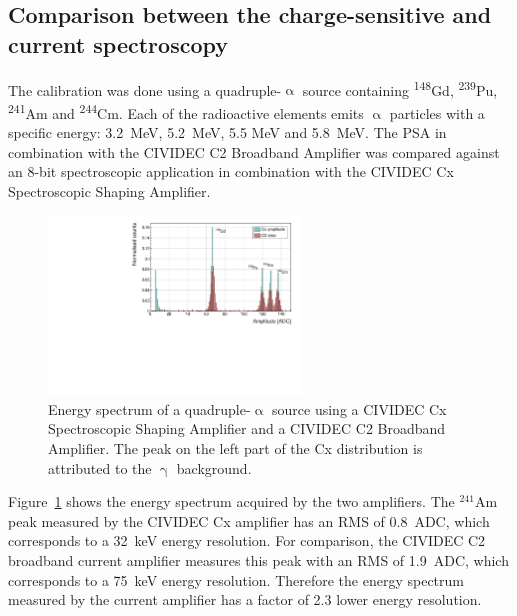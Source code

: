 \subsection{Comparison between the charge-sensitive and current spectroscopy}
The calibration was done using a quadruple-$\upalpha$ source containing \textsuperscript{148}Gd, \textsuperscript{239}Pu, \textsuperscript{241}Am and \textsuperscript{244}Cm. Each of the radioactive elements emits $\upalpha$ particles with a specific energy: 3.2~MeV, 5.2~MeV, 5.5 MeV and 5.8~MeV. The PSA in combination with the CIVIDEC C2 Broadband Amplifier was compared against an 8-bit spectroscopic application in combination with the CIVIDEC Cx Spectroscopic Shaping Amplifier.%

\begin{figure}[!t]
\centering
\includegraphics[width=0.6\textwidth]{../scripts/05_current_monitoring/plot4alpha/plots/4alphaCompare}
\caption{Energy spectrum of a quadruple-$\upalpha$ source using a CIVIDEC Cx Spectroscopic Shaping Amplifier and a CIVIDEC C2 Broadband Amplifier. The peak on the left part of the Cx distribution is attributed to the $\upgamma$ background.}
\label{fig:c2cx4alpha}
\end{figure}

Figure~\ref{fig:c2cx4alpha} shows the energy spectrum acquired by the two amplifiers. The $^{241}$Am peak measured by the CIVIDEC Cx amplifier has an RMS of 0.8~ADC, which corresponds to a 32~keV energy resolution. For comparison, the CIVIDEC C2 broadband current amplifier measures this peak with an RMS of 1.9~ADC, which corresponds to a 75~keV energy resolution. Therefore the energy spectrum measured by the current amplifier has a factor of 2.3 lower energy resolution.









